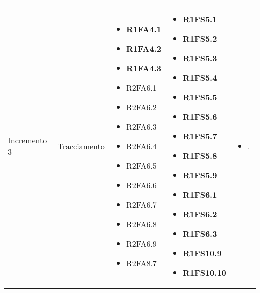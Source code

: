 {\begin{longtable}{C{2.5cm} C{3.2cm} C{2.8cm} C{2.8cm} C{2.8cm}}
Incremento 3 & Tracciamento & \begin{itemize}
    \item[ ] \textbf{R1FA4.1}
    \item[ ] \textbf{R1FA4.2}
    \item[ ] \textbf{R1FA4.3}
    \item[ ] R2FA6.1
    \item[ ] R2FA6.2
    \item[ ] R2FA6.3
    \item[ ] R2FA6.4
    \item[ ] R2FA6.5
    \item[ ] R2FA6.6
    \item[ ] R2FA6.7
    \item[ ] R2FA6.8 
    \item[ ] R2FA6.9
    \item[ ] R2FA8.7
\end{itemize}& \begin{itemize} 
    \item[ ] \textbf{R1FS5.1}
    \item[ ] \textbf{R1FS5.2}
    \item[ ] \textbf{R1FS5.3}
    \item[ ] \textbf{R1FS5.4}
    \item[ ] \textbf{R1FS5.5}
    \item[ ] \textbf{R1FS5.6}
    \item[ ] \textbf{R1FS5.7}
    \item[ ] \textbf{R1FS5.8}
    \item[ ] \textbf{R1FS5.9}
    \item[ ] \textbf{R1FS6.1}
    \item[ ] \textbf{R1FS6.2}
    \item[ ] \textbf{R1FS6.3}
    \item[ ] \textbf{R1FS10.9}
    \item[ ] \textbf{R1FS10.10}
\end{itemize} & \begin{itemize} 
    \item[ ] .
\end{itemize}\\


\end{longtable}}
